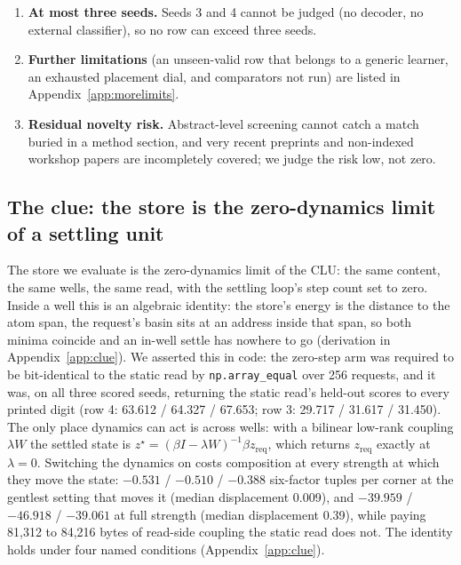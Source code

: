 \documentclass{article}
\begin{document}
\begin{enumerate}[leftmargin=*,itemsep=1pt]
{  retired.} The store refused the reachable-but-unwritten pair (0.9781) as often as the walled
  one (0.9801), at a false-refusal rate of 0.8182 on grounded-possible requests against a
  pre-registered 0.20.
  A ridge probe on the same observation at $t=0$ scores AUC 0.48--0.55 across all six seed and
  tier runs: deciding solvability within budget is close to solving the maze, a property of the
  task rather than a defect of the model.
  The Shapes3D coupling hole is a different object in a different environment and is untouched.
\item \textbf{At most three seeds.} Seeds 3 and 4 cannot be judged (no decoder, no external
  classifier), so no row can exceed three seeds.
\item \textbf{Further limitations} (an unseen-valid row that belongs to a generic learner, an
  exhausted placement dial, and comparators not run) are listed in Appendix~\ref{app:morelimits}.
\item \textbf{Residual novelty risk.} Abstract-level screening cannot catch a match buried in a
  method section, and very recent preprints and non-indexed workshop papers are incompletely
  covered; we judge the risk low, not zero.
\end{enumerate}

\subsection{The clue: the store is the zero-dynamics limit of a settling unit}
\label{sec:clue}

The store we evaluate is the zero-dynamics limit of the CLU: the same content, the same wells,
the same read, with the settling loop's step count set to zero. Inside a well this is an
algebraic identity: the store's energy is the distance to the atom span, the request's basin sits
at an address inside that span, so both minima coincide and an in-well settle has nowhere to go
(derivation in Appendix~\ref{app:clue}). We asserted this in code: the zero-step arm was required to be bit-identical to
the static read by \texttt{np.array\_equal} over 256 requests, and it was, on all three scored
seeds, returning the static read's held-out scores to every printed digit (row 4: 63.612 /
64.327 / 67.653; row 3: 29.717 / 31.617 / 31.450).
The only place dynamics can act is across wells: with a bilinear low-rank coupling $\lambda W$
the settled state is $z^\star=(\beta I-\lambda W)^{-1}\beta z_{\text{req}}$, which returns
$z_{\text{req}}$ exactly at $\lambda=0$. Switching the dynamics on costs composition at every
strength at which they move the state: $-0.531$ / $-0.510$ / $-0.388$ six-factor tuples per
corner at the gentlest setting that moves it (median displacement 0.009), and $-39.959$ /
$-46.918$ / $-39.061$ at full strength (median displacement 0.39), while paying 81,312 to 84,216
bytes of read-side coupling the static read does not.
The identity holds under four named conditions (Appendix~\ref{app:clue}).
\end{document}

